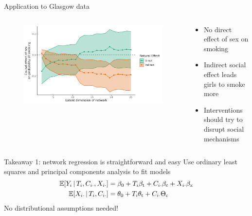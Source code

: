 \documentclass[aspectratio=169]{beamer}
\theoremstyle{remark}
\begin{document}
\begin{frame}{Application to Glasgow data}
    \begin{columns}
        \begin{column}{0.75\textwidth}
            \begin{figure}
                \includegraphics[width=1.05\textwidth]{figures/glasgow/effects.png}
            \end{figure}
        \end{column}
        \begin{column}{0.28\textwidth}
            \footnotesize
            \begin{itemize}
                \item No direct effect of sex on smoking
                \item Indirect social effect leads girls to smoke more
                \item Interventions should try to disrupt social mechanisms
            \end{itemize}
        \end{column}
    \end{columns}
\end{frame}

\begin{frame}{Takeaway 1: network regression is straightforward and easy}
    Use ordinary least squares and principal components analysis to fit models \\
    \begin{equation*}
        \begin{aligned}
            \E[T_i, \C_{i \cdot}, \X_{i \cdot}]{Y_i}
             & = \betazero + T_i \betat + \C_{i \cdot} \betac + \X_{i \cdot} \betax \\
            \E[T_i, \C_{i \cdot}]{\X_{i \cdot}}
             & = \thetazero + T_i \thetat  + \C_{i \cdot} \Thetac                   \\
        \end{aligned}
    \end{equation*}
    No distributional assumptions needed!
\end{frame}
\end{document}
